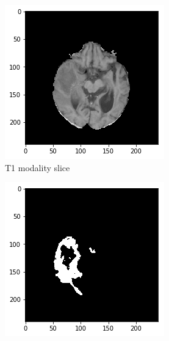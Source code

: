 \begin{figure}[H]
    \centering
    \begin{subfigure}{.24\textwidth}
        \centering
        \includegraphics[width=\linewidth]{chapters/06_hdm/Brats18_TCIA02_491_1_L2/1.png}
        \caption{T1 modality slice}
    \end{subfigure}%
    \begin{subfigure}{.24\textwidth}
        \centering
        \includegraphics[width=\linewidth]{chapters/06_hdm/Brats18_TCIA02_491_1_L2/0.png}

\end{subfigure}
\end{figure}
